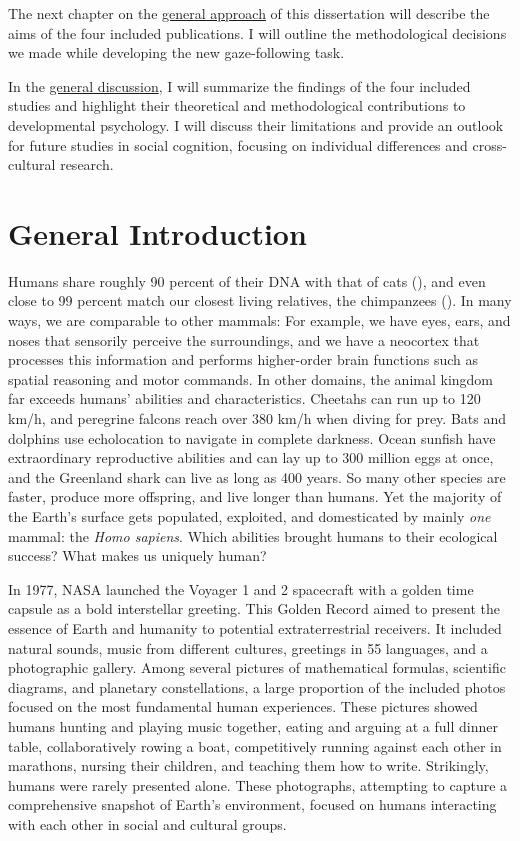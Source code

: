 \documentclass[
]{scrbook}
\begin{document}
The next chapter on the \hyperref[approach]{general approach} of this dissertation will describe the aims of the four included publications. I will outline the methodological decisions we made while developing the new gaze-following task.

In the \hyperref[discussion]{general discussion}, I will summarize the findings of the four included studies and highlight their theoretical and methodological contributions to developmental psychology. I will discuss their limitations and provide an outlook for future studies in social cognition, focusing on individual differences and cross-cultural research.

\mainmatter

\chapter{General Introduction}\label{introduction}

Humans share roughly 90 percent of their DNA with that of cats (), and even close to 99 percent match our closest living relatives, the chimpanzees (). In many ways, we are comparable to other mammals: For example, we have eyes, ears, and noses that sensorily perceive the surroundings, and we have a neocortex that processes this information and performs higher-order brain functions such as spatial reasoning and motor commands. In other domains, the animal kingdom far exceeds humans' abilities and characteristics. Cheetahs can run up to 120 km/h, and peregrine falcons reach over 380 km/h when diving for prey. Bats and dolphins use echolocation to navigate in complete darkness. Ocean sunfish have extraordinary reproductive abilities and can lay up to 300 million eggs at once, and the Greenland shark can live as long as 400 years. So many other species are faster, produce more offspring, and live longer than humans. Yet the majority of the Earth's surface gets populated, exploited, and domesticated by mainly \emph{one} mammal: the \emph{Homo sapiens}. Which abilities brought humans to their ecological success? What makes us uniquely human?

In 1977, NASA launched the Voyager 1 and 2 spacecraft with a golden time capsule as a bold interstellar greeting. This Golden Record aimed to present the essence of Earth and humanity to potential extraterrestrial receivers. It included natural sounds, music from different cultures, greetings in 55 languages, and a photographic gallery. Among several pictures of mathematical formulas, scientific diagrams, and planetary constellations, a large proportion of the included photos focused on the most fundamental human experiences. These pictures showed humans hunting and playing music together, eating and arguing at a full dinner table, collaboratively rowing a boat, competitively running against each other in marathons, nursing their children, and teaching them how to write. Strikingly, humans were rarely presented alone. These photographs, attempting to capture a comprehensive snapshot of Earth's environment, focused on humans interacting with each other in social and cultural groups.
\end{document}
